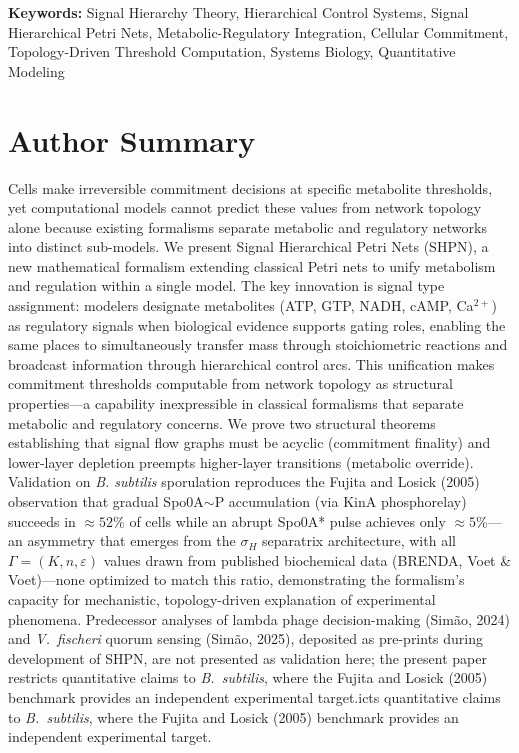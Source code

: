 \documentclass[10pt,letterpaper]{article}
\begin{document}
\vspace{6pt}
\noindent\textbf{Keywords:} Signal Hierarchy Theory, Hierarchical Control Systems, Signal Hierarchical Petri Nets, Metabolic-Regulatory Integration, Cellular Commitment, Topology-Driven Threshold Computation, Systems Biology, Quantitative Modeling

\section*{Author Summary}

Cells make irreversible commitment decisions at specific metabolite thresholds, yet computational models cannot predict these values from network topology alone because existing formalisms separate metabolic and regulatory networks into distinct sub-models. We present Signal Hierarchical Petri Nets (SHPN), a new mathematical formalism extending classical Petri nets to unify metabolism and regulation within a single model. The key innovation is signal type assignment: modelers designate metabolites (ATP, GTP, NADH, cAMP, Ca$^{2+}$) as regulatory signals when biological evidence supports gating roles, enabling the same places to simultaneously transfer mass through stoichiometric reactions and broadcast information through hierarchical control arcs. This unification makes commitment thresholds computable from network topology as structural properties---a capability inexpressible in classical formalisms that separate metabolic and regulatory concerns. We prove two structural theorems establishing that signal flow graphs must be acyclic (commitment finality) and lower-layer depletion preempts higher-layer transitions (metabolic override). Validation on \textit{B. subtilis} sporulation reproduces the Fujita and Losick (2005) observation that gradual Spo0A$\sim$P accumulation (via KinA phosphorelay) succeeds in $\approx 52\%$ of cells while an abrupt Spo0A* pulse achieves only $\approx 5\%$---an asymmetry that emerges from the $\sigma_H$ separatrix architecture, with all $\Gamma = (K, n, \varepsilon)$ values drawn from published biochemical data (BRENDA, Voet \& Voet)---none optimized to match this ratio, demonstrating the formalism's capacity for mechanistic, topology-driven explanation of experimental phenomena. Predecessor analyses of lambda phage decision-making (Sim\~{a}o, 2024) and \textit{V.\ fischeri} quorum sensing (Sim\~{a}o, 2025), deposited as pre-prints during development of SHPN, are not presented as validation here; the present paper restricts quantitative claims to \textit{B.\ subtilis}, where the Fujita and Losick (2005) benchmark provides an independent experimental target.icts quantitative claims to \textit{B.\ subtilis}, where the Fujita and Losick (2005) benchmark provides an independent experimental target.
\end{document}

